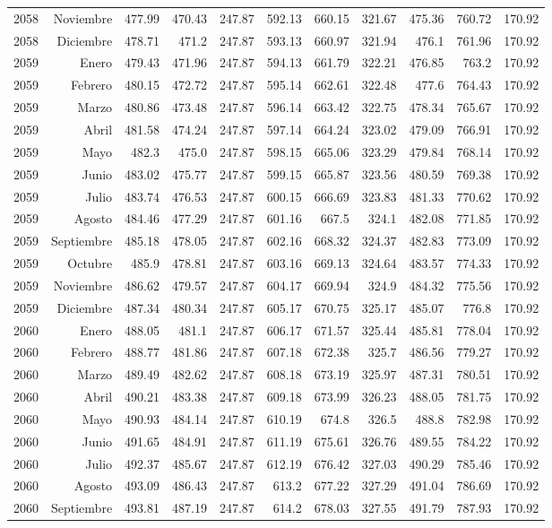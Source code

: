\documentclass{article}%
\begin{document}
\begin{longtable}{|l r|r|r|r|r|r|r|r|r|r|}
2058&Noviembre&477.99&470.43&247.87&592.13&660.15&321.67&475.36&760.72&170.92\\%
2058&Diciembre&478.71&471.2&247.87&593.13&660.97&321.94&476.1&761.96&170.92\\%
2059&Enero&479.43&471.96&247.87&594.13&661.79&322.21&476.85&763.2&170.92\\%
2059&Febrero&480.15&472.72&247.87&595.14&662.61&322.48&477.6&764.43&170.92\\%
2059&Marzo&480.86&473.48&247.87&596.14&663.42&322.75&478.34&765.67&170.92\\%
2059&Abril&481.58&474.24&247.87&597.14&664.24&323.02&479.09&766.91&170.92\\%
2059&Mayo&482.3&475.0&247.87&598.15&665.06&323.29&479.84&768.14&170.92\\%
2059&Junio&483.02&475.77&247.87&599.15&665.87&323.56&480.59&769.38&170.92\\%
2059&Julio&483.74&476.53&247.87&600.15&666.69&323.83&481.33&770.62&170.92\\%
2059&Agosto&484.46&477.29&247.87&601.16&667.5&324.1&482.08&771.85&170.92\\%
2059&Septiembre&485.18&478.05&247.87&602.16&668.32&324.37&482.83&773.09&170.92\\%
2059&Octubre&485.9&478.81&247.87&603.16&669.13&324.64&483.57&774.33&170.92\\%
2059&Noviembre&486.62&479.57&247.87&604.17&669.94&324.9&484.32&775.56&170.92\\%
2059&Diciembre&487.34&480.34&247.87&605.17&670.75&325.17&485.07&776.8&170.92\\%
2060&Enero&488.05&481.1&247.87&606.17&671.57&325.44&485.81&778.04&170.92\\%
2060&Febrero&488.77&481.86&247.87&607.18&672.38&325.7&486.56&779.27&170.92\\%
2060&Marzo&489.49&482.62&247.87&608.18&673.19&325.97&487.31&780.51&170.92\\%
2060&Abril&490.21&483.38&247.87&609.18&673.99&326.23&488.05&781.75&170.92\\%
2060&Mayo&490.93&484.14&247.87&610.19&674.8&326.5&488.8&782.98&170.92\\%
2060&Junio&491.65&484.91&247.87&611.19&675.61&326.76&489.55&784.22&170.92\\%
2060&Julio&492.37&485.67&247.87&612.19&676.42&327.03&490.29&785.46&170.92\\%
2060&Agosto&493.09&486.43&247.87&613.2&677.22&327.29&491.04&786.69&170.92\\%
2060&Septiembre&493.81&487.19&247.87&614.2&678.03&327.55&491.79&787.93&170.92\\%

\end{longtable}
\end{document}
